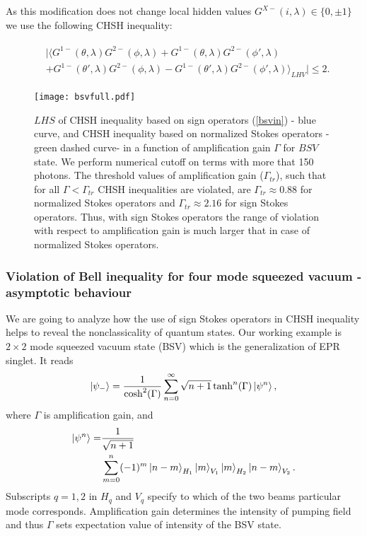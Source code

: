 \documentclass[aps,pra, twocolumn, showpacs]{revtex4-2}
\begin{document}
As this modification does not change local hidden values $G^{X-}(i,\lambda) \in \{0, \pm1\}$ we use the following CHSH inequality: 

\begin{align} 
\begin{split}
&|\langle G^{1-}(\theta,\lambda) G^{2-}(\phi,\lambda)+ G^{1-}(\theta,\lambda) G^{2-}(\phi',\lambda)\\
&+G^{1-}(\theta',\lambda) G^{2-}(\phi,\lambda)- G^{1-}(\theta',\lambda) G^{2-}(\phi',\lambda)\rangle_{LHV}|\leq 2. \label{bsvin}
\end{split}
\end{align}

\begin{figure}[h!]
\texttt{[image: bsvfull.pdf]} 
\caption{$LHS$ of  CHSH inequality based on sign operators (\ref{bsvin}) - blue curve, and CHSH inequality based on normalized Stokes operators \cite{ZUKUBELL} -green dashed curve- in a function of amplification gain $\Gamma$ for $BSV$ state. 
We perform numerical cutoff on terms with more that 150 photons. 
The threshold values of amplification gain ($\Gamma_{tr}$), such that for all  $\Gamma < \Gamma_{tr}$ CHSH inequalities are violated, are $\Gamma_{tr} \approx 0.88$ for normalized Stokes operators \cite{ZUKUBELL} and  $\Gamma_{tr} \approx 2.16$ for sign Stokes operators. 
Thus, with sign Stokes operators  the range of violation with respect to amplification gain is much larger that in case of normalized Stokes operators.}
\label{bsv}
\end{figure}

\subsubsection{Violation of Bell inequality for four mode squeezed vacuum - asymptotic behaviour}
\label{asym}

We are going to analyze how the use of sign Stokes operators in CHSH inequality helps to reveal  the nonclassicality of quantum states. Our working example is  $2\times 2$ mode squeezed vacuum state (BSV) which is the generalization of EPR singlet.  
It  reads
\begin{equation}
\ket{\psi_-}=\frac{1}{\cosh^2(\Gamma)}\sum_{n=0}^\infty\sqrt{n+1}\tanh^n(\Gamma)\ket{\psi^n},
\end{equation}
where  $\Gamma$ is amplification gain,  and
\begin{align}
\begin{split}
\ket{\psi^n}=&\frac{1}{\sqrt{n+1}}\\
&\sum_{m=0}^n(-1)^m\ket{n-m}_{H_1}\ket{m}_{V_1}\ket{m}_{H_2}\ket{n-m}_{V_2}.
\end{split}
\end{align}
Subscripts $q=1,2$ in $H_q$ and $V_q$ specify to which of the two beams particular mode corresponds. Amplification gain determines the  intensity of pumping field and thus $\Gamma$ sets expectation value of intensity of the BSV state.
\end{document}
